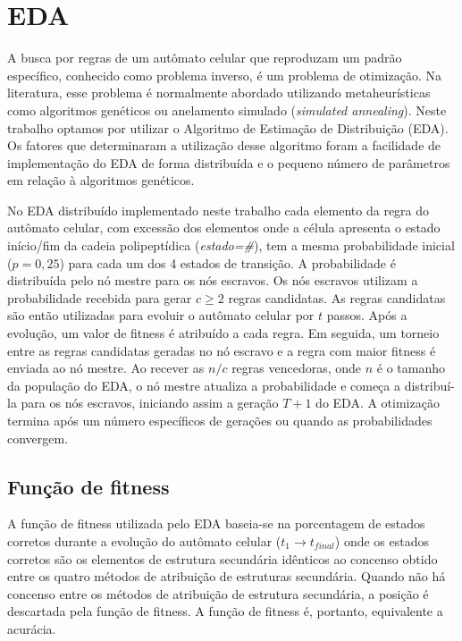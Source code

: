 \section{EDA}

A busca por regras de um autômato celular que reproduzam um padrão específico, conhecido como problema inverso, é um problema de otimização. Na literatura, esse problema é normalmente abordado utilizando metaheurísticas como algoritmos genéticos ou anelamento simulado (\textit{simulated annealing}). Neste trabalho optamos por utilizar o Algoritmo de Estimação de Distribuição (EDA). Os fatores que determinaram a utilização desse algoritmo foram a facilidade de implementação do EDA de forma distribuída e o pequeno número de parâmetros em relação à algoritmos genéticos.

No EDA distribuído implementado neste trabalho cada elemento da regra do autômato celular, com excessão dos elementos onde a célula apresenta o estado início/fim da cadeia polipeptídica (\textit{estado=\#}),  tem a mesma probabilidade inicial ($p=0,25$) para cada um dos 4 estados de transição. A probabilidade é distribuída pelo nó mestre para os nós escravos. Os nós escravos utilizam a probabilidade recebida para gerar $c \ge 2 $ regras candidatas. As regras candidatas são então utilizadas para evoluir o autômato celular por $t$ passos. Após a evolução, um valor de fitness é atribuído a cada regra. Em seguida, um torneio entre as regras candidatas geradas no nó escravo e a regra com maior fitness é enviada ao nó mestre. Ao recever as $n/c$ regras vencedoras, onde $n$ é o tamanho da população do EDA, o nó mestre atualiza a probabilidade e começa a distribuí-la para os nós escravos, iniciando assim a geração $T+1$ do EDA. A otimização termina após um número específicos de gerações ou quando as probabilidades convergem.

\subsection{Função de fitness}

A função de fitness utilizada pelo EDA baseia-se na porcentagem de estados corretos durante a evolução do autômato celular ($t_1 \rightarrow t_{final}$) onde os estados corretos são os elementos de estrutura secundária idênticos ao concenso obtido entre os quatro métodos de atribuição de estruturas secundária. Quando não há concenso entre os métodos de atribuição de estrutura secundária, a posição é descartada pela função de fitness. A função de fitness é, portanto, equivalente a acurácia.

